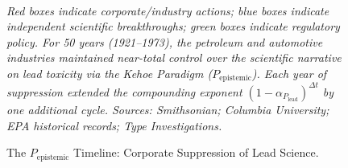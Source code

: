 \documentclass[12pt,openany]{book}
\begin{document}
\begin{figure}[htbp]
\\[0.45em]
\parbox{\linewidth}{\raggedright\small\emph{Red boxes indicate corporate/industry actions; blue boxes indicate independent scientific breakthroughs; green boxes indicate regulatory policy. For 50 years (1921--1973), the petroleum and automotive industries maintained near-total control over the scientific narrative on lead toxicity via the Kehoe Paradigm ($P_{\text{epistemic}}$). Each year of suppression extended the compounding exponent $(1 - \alpha_{P_{\text{lead}}})^{\Delta t}$ by one additional cycle. Sources: Smithsonian; Columbia University; EPA historical records; Type Investigations.}}
\caption{The $P_{\text{epistemic}}$ Timeline: Corporate Suppression of Lead Science.}
\label{fig:tel_chronology}
\end{figure}
\end{document}
